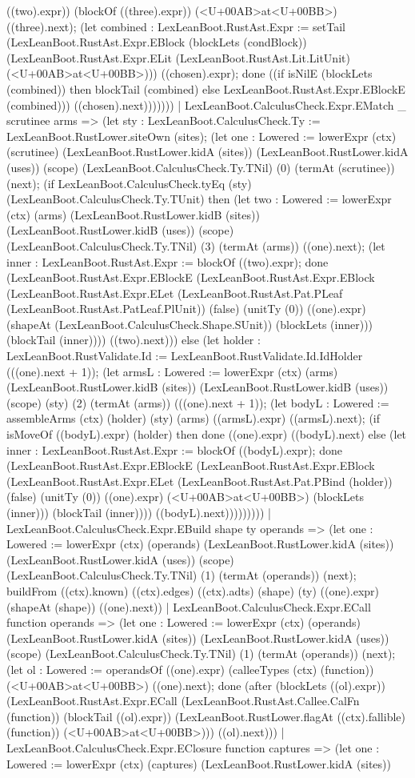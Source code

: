 \documentclass[11pt]{article}
\begin{document}
((two).expr)) (blockOf ((three).expr)) (<U+00AB>at<U+00BB>) ((three).next); (let combined : LexLeanBoot.RustAst.Expr := setTail (LexLeanBoot.RustAst.Expr.EBlock (blockLets (condBlock)) (LexLeanBoot.RustAst.Expr.ELit (LexLeanBoot.RustAst.Lit.LitUnit) (<U+00AB>at<U+00BB>))) ((chosen).expr); done ((if isNilE (blockLets (combined)) then blockTail (combined) else LexLeanBoot.RustAst.Expr.EBlockE (combined))) ((chosen).next))))))) | LexLeanBoot.CalculusCheck.Expr.EMatch \_ scrutinee arms => (let sty : LexLeanBoot.CalculusCheck.Ty := LexLeanBoot.RustLower.siteOwn (sites); (let one : Lowered := lowerExpr (ctx) (scrutinee) (LexLeanBoot.RustLower.kidA (sites)) (LexLeanBoot.RustLower.kidA (uses)) (scope) (LexLeanBoot.CalculusCheck.Ty.TNil) (0) (termAt (scrutinee)) (next); (if LexLeanBoot.CalculusCheck.tyEq (sty) (LexLeanBoot.CalculusCheck.Ty.TUnit) then (let two : Lowered := lowerExpr (ctx) (arms) (LexLeanBoot.RustLower.kidB (sites)) (LexLeanBoot.RustLower.kidB (uses)) (scope) (LexLeanBoot.CalculusCheck.Ty.TNil) (3) (termAt (arms)) ((one).next); (let inner : LexLeanBoot.RustAst.Expr := blockOf ((two).expr); done (LexLeanBoot.RustAst.Expr.EBlockE (LexLeanBoot.RustAst.Expr.EBlock (LexLeanBoot.RustAst.Expr.ELet (LexLeanBoot.RustAst.Pat.PLeaf (LexLeanBoot.RustAst.PatLeaf.PlUnit)) (false) (unitTy (0)) ((one).expr) (shapeAt (LexLeanBoot.CalculusCheck.Shape.SUnit)) (blockLets (inner))) (blockTail (inner)))) ((two).next))) else (let holder : LexLeanBoot.RustValidate.Id := LexLeanBoot.RustValidate.Id.IdHolder (((one).next + 1)); (let armsL : Lowered := lowerExpr (ctx) (arms) (LexLeanBoot.RustLower.kidB (sites)) (LexLeanBoot.RustLower.kidB (uses)) (scope) (sty) (2) (termAt (arms)) (((one).next + 1)); (let bodyL : Lowered := assembleArms (ctx) (holder) (sty) (arms) ((armsL).expr) ((armsL).next); (if isMoveOf ((bodyL).expr) (holder) then done ((one).expr) ((bodyL).next) else (let inner : LexLeanBoot.RustAst.Expr := blockOf ((bodyL).expr); done (LexLeanBoot.RustAst.Expr.EBlockE (LexLeanBoot.RustAst.Expr.EBlock (LexLeanBoot.RustAst.Expr.ELet (LexLeanBoot.RustAst.Pat.PBind (holder)) (false) (unitTy (0)) ((one).expr) (<U+00AB>at<U+00BB>) (blockLets (inner))) (blockTail (inner)))) ((bodyL).next))))))))) | LexLeanBoot.CalculusCheck.Expr.EBuild shape ty operands => (let one : Lowered := lowerExpr (ctx) (operands) (LexLeanBoot.RustLower.kidA (sites)) (LexLeanBoot.RustLower.kidA (uses)) (scope) (LexLeanBoot.CalculusCheck.Ty.TNil) (1) (termAt (operands)) (next); buildFrom ((ctx).known) ((ctx).edges) ((ctx).adts) (shape) (ty) ((one).expr) (shapeAt (shape)) ((one).next)) | LexLeanBoot.CalculusCheck.Expr.ECall function operands => (let one : Lowered := lowerExpr (ctx) (operands) (LexLeanBoot.RustLower.kidA (sites)) (LexLeanBoot.RustLower.kidA (uses)) (scope) (LexLeanBoot.CalculusCheck.Ty.TNil) (1) (termAt (operands)) (next); (let ol : Lowered := operandsOf ((one).expr) (calleeTypes (ctx) (function)) (<U+00AB>at<U+00BB>) ((one).next); done (after (blockLets ((ol).expr)) (LexLeanBoot.RustAst.Expr.ECall (LexLeanBoot.RustAst.Callee.CalFn (function)) (blockTail ((ol).expr)) (LexLeanBoot.RustLower.flagAt ((ctx).fallible) (function)) (<U+00AB>at<U+00BB>))) ((ol).next))) | LexLeanBoot.CalculusCheck.Expr.EClosure function captures => (let one : Lowered := lowerExpr (ctx) (captures) (LexLeanBoot.RustLower.kidA (sites)) 
\end{document}
